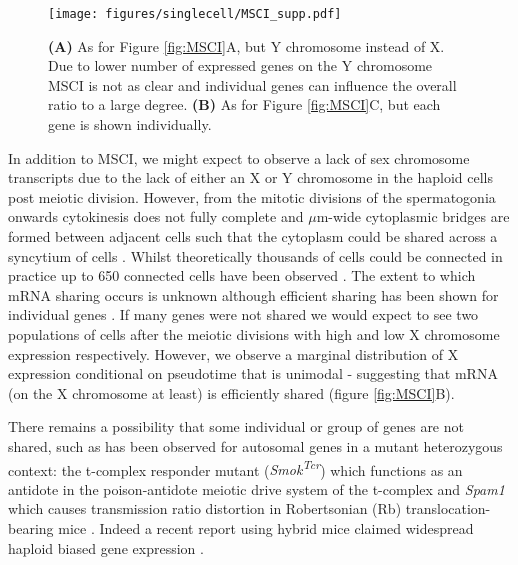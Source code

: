 \begin{figure}[H]
	\centering
	\texttt{[image: figures/singlecell/MSCI\_supp.pdf]}
	\caption[MSCI Supplement]{
		\textbf{(A)} As for Figure \ref{fig:MSCI}A, but Y chromosome instead of X. Due to lower number of expressed genes on the Y chromosome MSCI is not as clear and individual genes can influence the overall ratio to a large degree.
		\textbf{(B)} As for Figure \ref{fig:MSCI}C, but each gene is shown individually.}
	\label{fig:MSCI_supp}
\end{figure}


In addition to MSCI, we might expect to observe a lack of sex chromosome transcripts due to the lack of either an X or Y chromosome in the haploid cells post meiotic division. However, from the mitotic divisions of the spermatogonia onwards cytokinesis does not fully complete and $\mu$m-wide cytoplasmic bridges are formed between adjacent cells such that the cytoplasm could be shared across a syncytium of cells \parencite{Greenbaum2011Germ}. Whilst theoretically thousands of cells could be connected in practice up to 650 connected cells have been observed \parencite{Ren1991Clonal}. The extent to which mRNA sharing occurs is unknown although efficient sharing has been shown for individual genes \parencite{Braun1989Genetically}. If many genes were not shared we would expect to see two populations of cells after the meiotic divisions with high and low X chromosome expression respectively. However, we observe a marginal distribution of X expression conditional on pseudotime that is unimodal - suggesting that mRNA (on the X chromosome at least) is efficiently shared (figure \ref{fig:MSCI}B).

There remains a possibility that some individual or group of genes are not shared, such as has been observed for autosomal genes in a mutant heterozygous context: the t-complex responder mutant (\textit{Smok\textsuperscript{Tcr}}) which functions as an antidote in the poison-antidote meiotic drive system of the t-complex \parencite{Herrmann1999protein, Veron2009Retention} and \textit{Spam1} which causes transmission ratio distortion in Robertsonian (Rb) translocation-bearing mice \parencite{Martin-DeLeon2005Spam1associated}. Indeed a recent report using hybrid mice claimed widespread haploid biased gene expression \parencite{Bhutani2019Widespread}.


